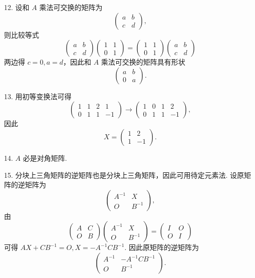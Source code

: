 \documentclass[UTF8,12pt,a4paper,fontset=fandol]{ctexart}
\begin{document}
12. 设和 $A$ 乘法可交换的矩阵为
\[
\left(
\begin{array}{cc}
a & b\\
c & d
\end{array}
\right),
\]
则比较等式
\[
\left(
\begin{array}{cc}
a & b\\
c & d
\end{array}
\right)
\left(
\begin{array}{cc}
1 & 1\\
0 & 1
\end{array}
\right)
=
\left(
\begin{array}{cc}
1 & 1\\
0 & 1
\end{array}
\right)
\left(
\begin{array}{cc}
a & b\\
c & d
\end{array}
\right)
\]
两边得 $c=0,a=d$，因此和 $A$ 乘法可交换的矩阵具有形状
\[
\left(
\begin{array}{cc}
a & b\\
0 & a
\end{array}
\right).
\]

13. 用初等变换法可得
\[
\left(
\begin{array}{cc|rr}
1 & 1 & 2 & 1\\
0 & 1 & 1 & -1
\end{array}
\right)
\to
\left(
\begin{array}{cc|rr}
1 & 0 & 1 & 2\\
0 & 1 & 1 & -1
\end{array}
\right),
\]
因此
\[
X=
\left(
\begin{array}{rr}
1 & 2\\
1 & -1
\end{array}
\right).
\]

14. $A$ 必是对角矩阵.

15. 分块上三角矩阵的逆矩阵也是分块上三角矩阵，因此可用待定元素法. 设原矩阵的逆矩阵为
\[
\left(
\begin{array}{cc}
A^{-1} & X\\
O & B^{-1}
\end{array}
\right),
\]
由
\[
\left(
\begin{array}{cc}
A & C\\
O & B
\end{array}
\right)
\left(
\begin{array}{cc}
A^{-1} & X\\
O & B^{-1}
\end{array}
\right)
=
\left(
\begin{array}{cc}
I & O\\
O & I
\end{array}
\right)
\]
可得 $AX+CB^{-1}=O, X=-A^{-1}CB^{-1}$. 因此原矩阵的逆矩阵为
\[
\left(
\begin{array}{cc}
A^{-1} & -A^{-1}CB^{-1}\\
O & B^{-1}
\end{array}
\right).
\]
\end{document}
